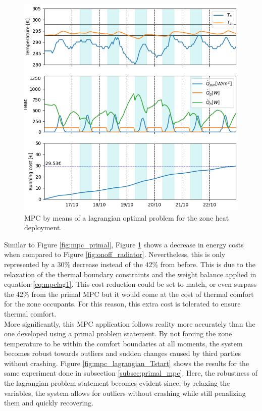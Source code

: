 \begin{figure}[H]
\centering
\includegraphics[scale=0.8]{images/mpc_lagrangian.png}
\caption{MPC by means of a lagrangian optimal problem for the zone heat deployment.}
\label{fig:mpc_lagrangian}
\end{figure}

Similar to Figure \ref{fig:mpc_primal}, Figure \ref{fig:mpc_lagrangian} shows a decrease in energy costs when compared to Figure \ref{fig:onoff_radiator}. Nevertheless, this is only represented by a 30\% decrease instead of the 42\% from before. This is due to the relaxation of the thermal boundary constraints and the weight balance applied in equation \ref{eq:mpclag1}. This cost reduction could be set to match, or even surpass the 42\% from the primal MPC but it would come at the cost of thermal comfort for the zone occupants. For this reason, this extra cost is tolerated to ensure thermal comfort.\\

More significantly, this MPC application follows reality more accurately than the one developed using a primal problem statement. By not forcing the zone temperature to be within the comfort boundaries at all moments, the system becomes robust towards outliers and sudden changes caused by third parties without crashing. Figure \ref{fig:mpc_lagrangian_Tstart} shows the results for the same experiment done in subsection \ref{subsec:primal_mpc}. Here, the robustness of the lagrangian problem statement becomes evident since, by relaxing the variables, the system allows for outliers without crashing while still penalizing them and quickly recovering.

